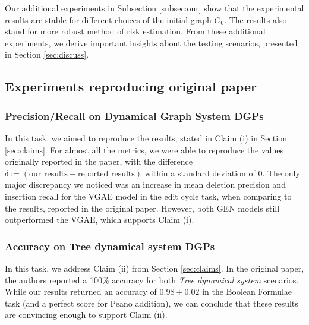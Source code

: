 Our additional experiments in Subsection \ref{subsec:our} show that the experimental results are stable for different choices of the initial graph $G_{0}$. The results also stand for more robust method of risk estimation. From these additional experiments, we derive important insights about the testing scenarios, presented in Section \ref{sec:discuss}. 




\subsection{Experiments reproducing original paper}
\label{subsec:original}

\subsubsection{Precision/Recall on Dynamical Graph System DGPs}
\label{exp:first}
In this task, we aimed to reproduce the results, stated in Claim (i) in Section \ref{sec:claims}. For almost all the metrics, we were able to reproduce the values originally reported in the paper, with the difference $\delta := (\text{our results} - \text{reported results})$ within a standard deviation of 0. The only major discrepancy we noticed was an increase in mean deletion precision and insertion recall for the VGAE model in the edit cycle task, when comparing to the results, reported in the original paper. However, both GEN models still outperformed the VGAE, which supports Claim (i).  

\subsubsection{Accuracy on Tree dynamical system DGPs}
\label{exp:second}
In this task, we address Claim (ii) from Section \ref{sec:claims}. In the original paper, the authors reported a 100\% accuracy for both \textit{Tree dynamical system} scenarios. While our results returned an accuracy of $0.98 \pm 0.02$ in the Boolean Formulae task (and a perfect score for Peano addition), we can conclude that these results are convincing enough to support Claim (ii).






